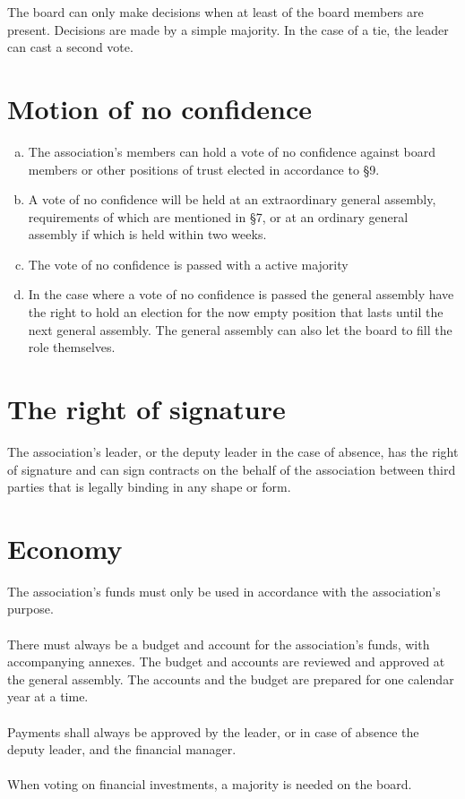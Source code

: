 \documentclass[12pt,a4paper,norsk]{article}
\begin{document}
The board can only make decisions when at least  of the board members are present. Decisions are made by a simple majority. In the case of a tie, the leader can cast a second vote.


\section{Motion of no confidence}
\begin{enumerate}[a)]
    \item The association's members can hold a vote of no confidence against board members or other positions of trust elected in accordance to §9.
    \item A vote of no confidence will be held at an extraordinary general assembly, requirements of which are mentioned in §7, or at an ordinary general assembly if which is held within two weeks.
    \item The vote of no confidence is passed with a  active majority
    \item In the case where a vote of no confidence is passed the general assembly have the right to hold an election for the now empty position that lasts until the next general assembly. The general assembly can also let the board to fill the role themselves.
\end{enumerate}



\section{The right of signature}

The association's leader, or the deputy leader in the case of absence, has the right of signature and can sign contracts on the behalf of the association  between third parties that is legally binding in any shape or form.


\section{Economy}

The association's funds must only be used in accordance with the association's purpose.
\\
\\
There must always be a budget and account for the association's funds, with accompanying annexes. The budget and accounts are reviewed and approved at the general assembly. The accounts and the budget are prepared for one calendar year at a time.
\\
\\
Payments shall always be approved by the leader, or in case of absence the deputy leader, and the financial manager.
\\
\\
When voting on financial investments, a  majority is needed on the board.
\end{document}
